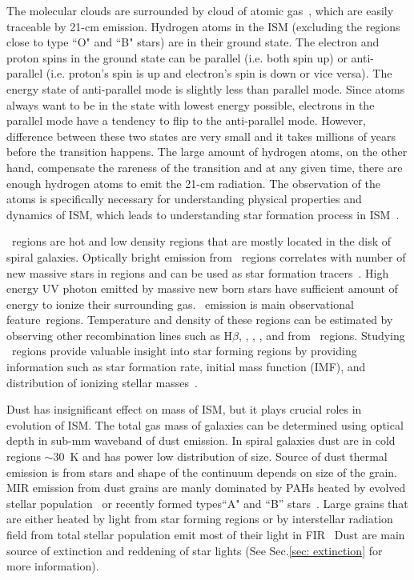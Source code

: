 The molecular clouds are surrounded by cloud of atomic gas~\citep{Kennicutt12}, which are easily traceable by 21-cm emission.
Hydrogen atoms in the ISM (excluding the regions close to type ``O" and ``B" stars) are in their ground state. 
The electron and proton spins in the ground state can be parallel (i.e. both spin up) or anti-parallel (i.e. proton's spin is up and electron's spin is down or vice versa). 
The energy state of anti-parallel mode is slightly less than parallel mode.
Since atoms always want to be in the state with lowest energy possible, electrons in the parallel mode have a tendency to flip to the anti-parallel mode. 
However, difference between these two states are very small and it takes millions of years before the transition happens.
The large amount of hydrogen atoms, on the other hand, compensate the rareness of the transition and at any given time, there are enough hydrogen atoms to emit the 21-cm radiation. 
The observation of the \hi atoms is specifically necessary for understanding physical properties and dynamics of ISM, which leads to understanding star formation process in ISM~\citep{Walter08}.

\hii~regions are hot and low density regions that are mostly located in the disk of spiral galaxies.
Optically bright \halpha emission from \hii~regions correlates with number of new massive stars in regions and can be used as star formation tracers~\citep[e.g.][]{Kennicutt98b,Calzetti13}. 
High energy UV photon emitted by massive new born stars have sufficient amount of energy to ionize their surrounding gas.
~\halpha emission is main observational feature\hii~regions.
Temperature and density of these regions can be estimated by observing other recombination lines such as H$\beta$, \sii, \oii, \oiii, and \nii from \hii~regions.
Studying \hii~regions provide valuable insight into star forming regions by providing information such as star formation rate, initial mass function (IMF), and distribution of ionizing stellar masses~\citep[][and references therein]{Azimlu11}.

Dust has insignificant effect on mass of ISM, but it plays crucial roles in evolution of ISM.
The total gas mass of galaxies can be determined using optical depth in sub-mm waveband of dust emission. 
In spiral galaxies dust are in cold regions $\sim 30$~K and has power low distribution of size.
Source of dust thermal emission is from stars and shape of the continuum depends on size of the grain.
MIR emission from dust grains are manly dominated by PAHs heated by evolved stellar population~\cite{Smith07a} or recently formed types``A" and ``B'' stars~\cite{Peeters04}.
Large grains that are either heated by light from star forming regions or by interstellar radiation field from total stellar population emit most of their light in FIR~\citep[e.g.][]{Calapa14, lu14}
Dust are main source of extinction and reddening of star lights (See Sec.\ref{sec: extinction} for more information).

